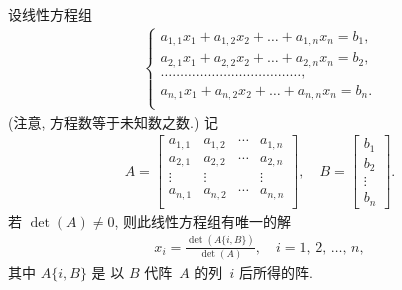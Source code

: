 \documentclass[%
    UTF8,%
    fontset=none,%
    punct=kaiming,%
    zihao=-4,%
    a4paper,%
    oneside,%
]{ctexbook}
\begin{document}
\begin{theorem}[Cramer 公式, 2]
    设线性方程组
    \begin{align*}
        \begin{cases}
            a_{1,1} x_1 + a_{1,2} x_2 + \dots
            + a_{1,n} x_n = b_1, \\
            a_{2,1} x_1 + a_{2,2} x_2 + \dots
            + a_{2,n} x_n = b_2, \\
            \dots \dots \dots \dots
            \dots \dots \dots \dots
            \dots \dots \dots \dots,
            \\
            a_{n,1} x_1 + a_{n,2} x_2 + \dots
            + a_{n,n} x_n = b_n. \\
        \end{cases}
    \end{align*}
    (注意, 方程数等于未知数之数.)
    记
    \begin{align*}
        A =
        \begin{bmatrix}
            a_{1,1} & a_{1,2} & \cdots & a_{1,n} \\
            a_{2,1} & a_{2,2} & \cdots & a_{2,n} \\
            \vdots  & \vdots  & {}     & \vdots  \\
            a_{n,1} & a_{n,2} & \cdots & a_{n,n} \\
        \end{bmatrix},
        \quad
        B =
        \begin{bmatrix}
            b_1 \\ b_2 \\ \vdots \\ b_n
        \end{bmatrix}.
    \end{align*}
    若 \(\det {(A)} \neq 0\),
    则此线性方程组有唯一的解
    \begin{align*}
        x_i = \frac{\det {(A \{i, B\})}}{\det {(A)}},
        \quad
        \text{\(i = 1\), \(2\), \(\dots\), \(n\)},
    \end{align*}
    其中 \(A \{i, B\}\) 是%
    以 \(B\) 代阵~\(A\) 的列~\(i\) 后所得的阵.
\end{theorem}
\end{document}
